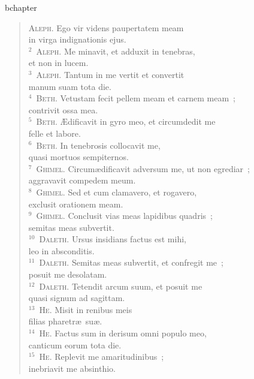 bchapter\begin{flushleft}\begin{verse}\vspace{-19pt}\textsc{Aleph.} Ego vir videns paupertatem meam\\ in virga indignationis ejus.\\
${}^{2}$~\textsc{Aleph.} Me minavit, et adduxit in tenebras,\\ et non in lucem.\\
${}^{3}$~\textsc{Aleph.} Tantum in me vertit et convertit\\ manum suam tota die.\\
${}^{4}$~\textsc{Beth.} Vetustam fecit pellem meam et carnem meam~;\\ contrivit ossa mea.\\
${}^{5}$~\textsc{Beth.} \AE dificavit in gyro meo, et circumdedit me\\ felle et labore.\\
${}^{6}$~\textsc{Beth.} In tenebrosis collocavit me,\\ quasi mortuos sempiternos.\\
${}^{7}$~\textsc{Ghimel.} Circum\ae dificavit adversum me, ut non egrediar~;\\ aggravavit compedem meum.\\
${}^{8}$~\textsc{Ghimel.} Sed et cum clamavero, et rogavero,\\ exclusit orationem meam.\\
${}^{9}$~\textsc{Ghimel.} Conclusit vias meas lapidibus quadris~;\\ semitas meas subvertit.\\
${}^{10}$~\textsc{Daleth.} Ursus insidians factus est mihi,\\ leo in absconditis.\\
${}^{11}$~\textsc{Daleth.} Semitas meas subvertit, et confregit me~;\\ posuit me desolatam.\\
${}^{12}$~\textsc{Daleth.} Tetendit arcum suum, et posuit me\\ quasi signum ad sagittam.\\
${}^{13}$~\textsc{He.} Misit in renibus meis\\ filias pharetr\ae\ su\ae .\\
${}^{14}$~\textsc{He.} Factus sum in derisum omni populo meo,\\ canticum eorum tota die.\\
${}^{15}$~\textsc{He.} Replevit me amaritudinibus~;\\ inebriavit me absinthio.\\

\end{verse}
\end{flushleft}
